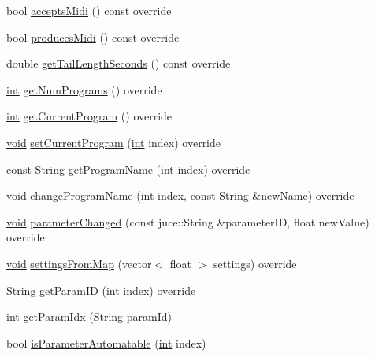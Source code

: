 \begin{DoxyCompactItemize}
\item 
bool \hyperlink{class_audealize_1_1_audealizereverb_audio_processor_a070d7a6bf9617fcf3e8ff901d973c3e4}{accepts\+Midi} () const  override
\item 
bool \hyperlink{class_audealize_1_1_audealizereverb_audio_processor_abd5d8bacc498bdac1eeea1bedd4b2e17}{produces\+Midi} () const  override
\item 
double \hyperlink{class_audealize_1_1_audealizereverb_audio_processor_a622a48a5741afbfe65114a031fd6521d}{get\+Tail\+Length\+Seconds} () const  override
\item 
\hyperlink{tk_8h_a83f82f76e7fed06f4c49d2db94028a6d}{int} \hyperlink{class_audealize_1_1_audealizereverb_audio_processor_a59f63e65b4ecadd00c3cc932a0538c21}{get\+Num\+Programs} () override
\item 
\hyperlink{tk_8h_a83f82f76e7fed06f4c49d2db94028a6d}{int} \hyperlink{class_audealize_1_1_audealizereverb_audio_processor_a1088d42f1aa689ff1b5122d372739888}{get\+Current\+Program} () override
\item 
\hyperlink{tk_8h_aba408b7cd755a96426e004c015f5de8e}{void} \hyperlink{class_audealize_1_1_audealizereverb_audio_processor_a47fc36254b2bef0a0427143868e0128e}{set\+Current\+Program} (\hyperlink{tk_8h_a83f82f76e7fed06f4c49d2db94028a6d}{int} index) override
\item 
const String \hyperlink{class_audealize_1_1_audealizereverb_audio_processor_ab9f79aecbdb3781429d5903a29116e0c}{get\+Program\+Name} (\hyperlink{tk_8h_a83f82f76e7fed06f4c49d2db94028a6d}{int} index) override
\item 
\hyperlink{tk_8h_aba408b7cd755a96426e004c015f5de8e}{void} \hyperlink{class_audealize_1_1_audealizereverb_audio_processor_ac24bb57c2e0a915d93597c8b40a947cf}{change\+Program\+Name} (\hyperlink{tk_8h_a83f82f76e7fed06f4c49d2db94028a6d}{int} index, const String \&new\+Name) override
\item 
\hyperlink{tk_8h_aba408b7cd755a96426e004c015f5de8e}{void} \hyperlink{class_audealize_1_1_audealizereverb_audio_processor_aafb771cae87f2ce62ca2451d80678277}{parameter\+Changed} (const juce\+::\+String \&parameter\+ID, float new\+Value) override
\item 
\hyperlink{tk_8h_aba408b7cd755a96426e004c015f5de8e}{void} \hyperlink{class_audealize_1_1_audealizereverb_audio_processor_a4a9a5828a3cbbb084a3025009500faf9}{settings\+From\+Map} (vector$<$ float $>$ settings) override
\item 
String \hyperlink{class_audealize_1_1_audealizereverb_audio_processor_a20e3cb24628efda50a559ce164a7fed5}{get\+Param\+ID} (\hyperlink{tk_8h_a83f82f76e7fed06f4c49d2db94028a6d}{int} index) override
\item 
\hyperlink{tk_8h_a83f82f76e7fed06f4c49d2db94028a6d}{int} \hyperlink{class_audealize_1_1_audealizereverb_audio_processor_a10250897a1cd4d63389f27deae3d615b}{get\+Param\+Idx} (String param\+Id)
\item 
bool \hyperlink{class_audealize_1_1_audealizereverb_audio_processor_abaa19b64ec3373e411c7c327c9d93b61}{is\+Parameter\+Automatable} (\hyperlink{tk_8h_a83f82f76e7fed06f4c49d2db94028a6d}{int} index)
\end{DoxyCompactItemize}
